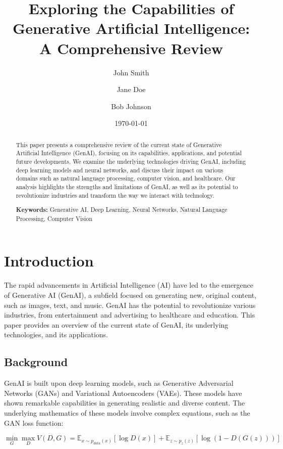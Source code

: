 \documentclass[12pt,a4paper]{article}
\title{Exploring the Capabilities of Generative Artificial Intelligence: A Comprehensive Review}
\author{John Smith \and Jane Doe \and Bob Johnson}
\date{\today}
\begin{document}
\maketitle
\thispagestyle{empty}

\begin{abstract}
This paper presents a comprehensive review of the current state of Generative Artificial Intelligence (GenAI), focusing on its capabilities, applications, and potential future developments. We examine the underlying technologies driving GenAI, including deep learning models and neural networks, and discuss their impact on various domains such as natural language processing, computer vision, and healthcare. Our analysis highlights the strengths and limitations of GenAI, as well as its potential to revolutionize industries and transform the way we interact with technology.

\textbf{Keywords:} Generative AI, Deep Learning, Neural Networks, Natural Language Processing, Computer Vision
\end{abstract}

\newpage
\tableofcontents
\newpage

\section{Introduction}
The rapid advancements in Artificial Intelligence (AI) have led to the emergence of Generative AI (GenAI), a subfield focused on generating new, original content, such as images, text, and music. GenAI has the potential to revolutionize various industries, from entertainment and advertising to healthcare and education. This paper provides an overview of the current state of GenAI, its underlying technologies, and its applications.

\subsection{Background}
GenAI is built upon deep learning models, such as Generative Adversarial Networks (GANs) and Variational Autoencoders (VAEs). These models have shown remarkable capabilities in generating realistic and diverse content. The underlying mathematics of these models involve complex equations, such as the GAN loss function:

\begin{equation}
\min_G \max_D V(D,G) = \mathbb{E}_{x \sim p_{data}(x)}[\log D(x)] + \mathbb{E}_{z \sim p_z(z)}[\log(1-D(G(z)))]
\end{equation}
\end{document}
